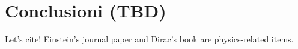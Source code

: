 \documentclass[12pt,a4paper,twoside]{report}
\begin{document}
	
	
	
	
	
	
	
	
	
	
	


	
	
	
	
			
	\chapter*{Conclusioni (TBD)}
		Let's cite! Einstein's journal paper \cite{einstein} and Dirac's book \cite{dirac} are physics-related items.
	\newpage	
	\printbibliography[
		heading=bibintoc,
		title={Bibliografia}
		]
		 	
\end{document}
